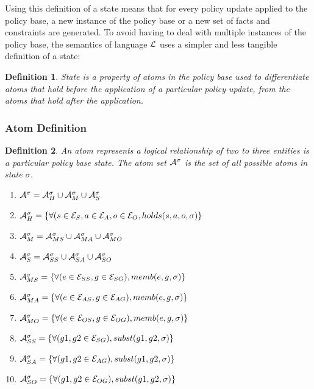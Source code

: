 \documentclass[10pt, twocolumn]{article}
\newtheorem{definition}{Definition}
\begin{document}
        Using this definition of a state means that for every policy update
        applied to the policy base, a new instance of the policy base or a new 
        set of facts and constraints are generated. To avoid having to deal
        with multiple instances of the policy base, the semantics of language
        ${\cal L}$ uses a simpler and less tangible definition of a state:

        \begin{definition}
          State is a property of atoms in the policy base used to differentiate
          atoms that hold before the application of a particular policy update,
          from the atoms that hold after the application.
        \end{definition}

      \subsubsection{Atom Definition}

        \begin{definition}
          An atom represents a logical relationship of two to three entities
          is a particular policy base state. The atom set $\cal{A}^{\sigma}$ is
          the set of all possible atoms in state $\sigma$.

          \begin{enumerate}
            \item
              ${\cal A}^{\sigma} = {\cal A}^{\sigma}_{H} \cup {\cal A}^{\sigma}_{M} \cup {\cal A}^{\sigma}_{S}$
            \item
              ${\cal A}^{\sigma}_{H} = \{\forall (s \in {\cal E}_{S}, a \in {\cal E}_{A}, o \in {\cal E}_{O}, holds(s, a, o, \sigma) \}$
            \item
              ${\cal A}^{\sigma}_{M} = {\cal A}^{\sigma}_{MS} \cup {\cal A}^{\sigma}_{MA} \cup {\cal A}^{\sigma}_{MO}$
            \item
              ${\cal A}^{\sigma}_{S} = {\cal A}^{\sigma}_{SS} \cup {\cal A}^{\sigma}_{SA} \cup {\cal A}^{\sigma}_{SO}$
            \item
              ${\cal A}^{\sigma}_{MS} = \{\forall (e \in {\cal E}_{SS}, g \in {\cal E}_{SG}), memb(e, g, \sigma)\}$
            \item
              ${\cal A}^{\sigma}_{MA} = \{\forall (e \in {\cal E}_{AS}, g \in {\cal E}_{AG}), memb(e, g, \sigma)\}$
            \item
              ${\cal A}^{\sigma}_{MO} = \{\forall (e \in {\cal E}_{OS}, g \in {\cal E}_{OG}), memb(e, g, \sigma)\}$
            \item
              ${\cal A}^{\sigma}_{SS} = \{\forall (g1, g2 \in {\cal E}_{SG}), subst(g1, g2, \sigma)\}$
            \item
              ${\cal A}^{\sigma}_{SA} = \{\forall (g1, g2 \in {\cal E}_{AG}), subst(g1, g2, \sigma)\}$
            \item
              ${\cal A}^{\sigma}_{SO} = \{\forall (g1, g2 \in {\cal E}_{OG}), subst(g1, g2, \sigma)\}$
          \end{enumerate}

        \end{definition} 
\end{document}
